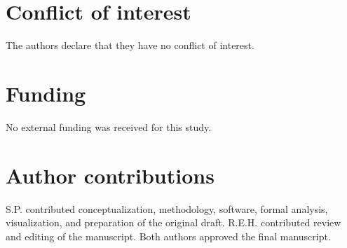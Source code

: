 \documentclass[numsec,webpdf,modern,medium,namedate]{oup-authoring-template}
\theoremstyle{plain}
\theoremstyle{definition}
\theoremstyle{remark}
\begin{document}
\section*{Conflict of interest}
The authors declare that they have no conflict of interest.

\section*{Funding}
No external funding was received for this study.

\section*{Author contributions}
S.P. contributed conceptualization, methodology, software, formal analysis,
visualization, and preparation of the original draft. R.E.H. contributed
review and editing of the manuscript. Both authors approved the final
manuscript.


\end{document}
